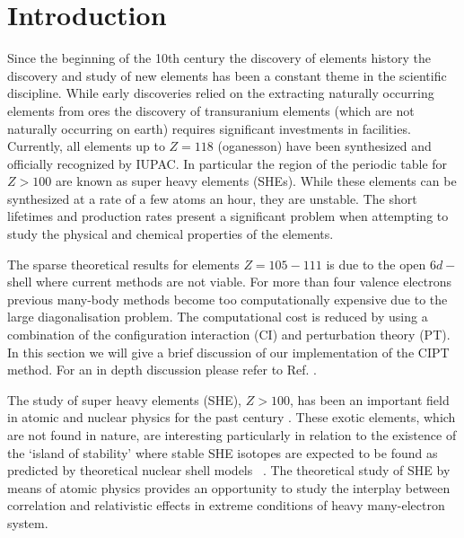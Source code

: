 \documentclass[10pt,a4paper, twoside]{report}
\begin{document}
\chapter{Introduction} \label{chap:P2Intro}
Since the beginning of the 10th century the discovery of elements history the discovery and study of new elements has been a constant theme  in the scientific discipline. While early discoveries relied on the extracting naturally occurring elements from ores the discovery of transuranium elements (which are not naturally occurring on earth) requires significant investments in facilities. Currently, all elements up to $Z=118$ (oganesson) have been synthesized and officially recognized by IUPAC. In particular the region of the periodic table for $Z>100$ are known as super heavy elements (SHEs). While these elements can be synthesized at a rate of a few atoms an hour, they are unstable. The short lifetimes and production rates present a significant problem when attempting to study the physical and chemical properties of the elements. 



The sparse theoretical results for elements $Z=105-111$ is due to the open $6d-$shell where current methods are not viable. For more than four valence electrons previous many-body methods become too computationally expensive due to the large diagonalisation problem. The computational cost is reduced by using a combination of the configuration interaction (CI) and perturbation theory (PT). In this section we will give a brief discussion of our implementation of the CIPT method. For an in depth discussion please refer to Ref. \cite{DBHF2017}. 

The study of super heavy elements (SHE), $Z > 100$, has been an important field in atomic and nuclear physics for the 
past century \cite{Oganessian2009,  HHO2013}.  These exotic elements, which are not found in nature, are interesting
particularly in relation to the existence of the `island of stability' where stable SHE isotopes are expected to be found 
as predicted by theoretical nuclear shell models ~\cite{OUL2004, HHO2013, Leino2016, Oganessian2012}. 
The theoretical study of SHE by means of atomic physics provides an opportunity to study the interplay between correlation and
relativistic effects in extreme conditions of heavy many-electron system.

\end{document}
